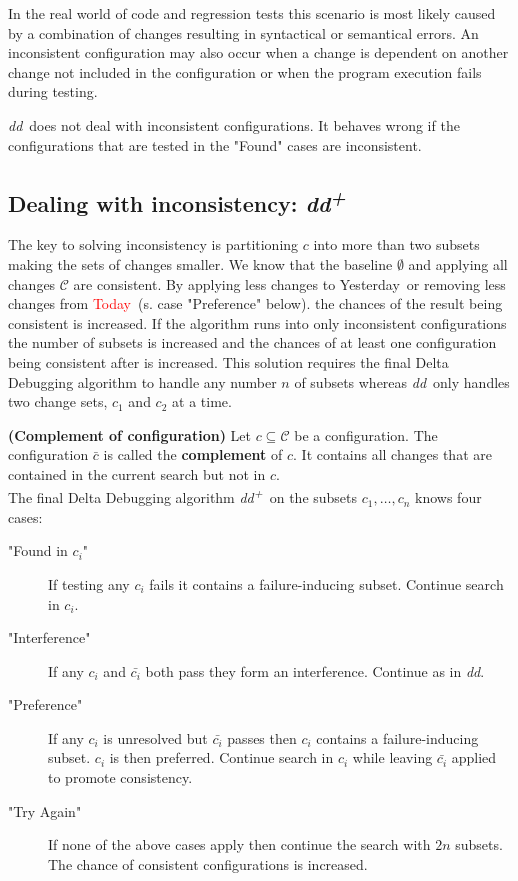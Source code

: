 \documentclass[a4paper,UKenglish]{lipics-v2018}
\newcommand{\dd}[0]{\textit{dd}}
\newcommand{\ddp}{\textit{dd\textsuperscript{+}}}
\newcommand{\green}[1]{\textcolor{td-green}{#1}}
\newcommand{\red}[1]{\textcolor{red}{#1}}
\newcommand{\yd}[0]{\green{Yesterday}}
\newcommand{\td}[0]{\red{Today}}
\newcommand{\C}[0]{\ensuremath{\mathcal{C}}}
\newcommand{\defsub}[1]{\textbf{(#1)} }
\begin{document}
In the real world of code and regression tests this scenario is most likely caused by a combination of changes resulting in syntactical or semantical errors. An inconsistent configuration may also occur when a change is dependent on another change not included in the configuration or when the program execution fails during testing. 

\dd\ does not deal with inconsistent configurations. It behaves wrong if the configurations that are tested in the "Found" cases are inconsistent.


\subsection{Dealing with inconsistency: \ddp}

The key to solving inconsistency is partitioning $c$ into more than two subsets making the sets of changes smaller. We know that the baseline $\emptyset$ and applying all changes $\C$ are consistent. By applying less changes to \yd\ or removing less changes from \td\ (s. case "Preference" below). the chances of the result being consistent is increased. If the algorithm runs into only inconsistent configurations the number of subsets is increased and the chances of at least one configuration being consistent after is increased. This solution requires the final Delta Debugging algorithm to handle any number $n$ of subsets whereas \dd\ only handles two change sets, $c_1$ and $c_2$ at a time.

 \defsub{Complement of configuration} Let $c \subseteq \C$ be a configuration. The configuration $\bar{c}$ is called the \textbf{complement} of $c$. It contains all changes that are contained in the current search but not in $c$.\\

The final Delta Debugging algorithm \ddp\ on the subsets $c_1, \dots, c_n$ knows four cases:\\
\begin{description}
	\item["Found in $c_i$"] If testing any $c_i$ fails it contains a failure-inducing subset. Continue search in $c_i$.
	\item["Interference"] If any $c_i$ and $\bar{c_i}$ both pass they form an interference. Continue as in \dd.
	\item["Preference"] If any $c_i$ is unresolved but $\bar{c_i}$ passes then $c_i$ contains a failure-inducing subset. $c_i$ is then preferred. Continue search in $c_i$ while leaving $\bar{c_i}$ applied to promote consistency.
	\item["Try Again"] If none of the above cases apply then continue the search with $2n$ subsets. The chance of consistent configurations is increased.
\end{description}
\end{document}
